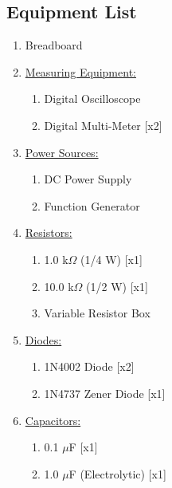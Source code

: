 \documentclass[twocolumn,english]{IEEEtran}
\begin{document}
\subsection{Equipment List}
\begin{enumerate}
  \item Breadboard
  \item \underline {Measuring Equipment:}
    \begin{enumerate}
      \item Digital Oscilloscope
      \item Digital Multi-Meter \hfill[x2]
    \end{enumerate}
  \item \underline {Power Sources:}
    \begin{enumerate}
    \item DC Power Supply
    \item Function Generator
    \end{enumerate}
  \item \underline{Resistors:}
    \begin{enumerate}
    \item 1.0 k$\Omega$ (1/4 W) \hfill[x1]
    \item 10.0 k$\Omega$ (1/2 W) \hfill[x1]
    \item Variable Resistor Box
    \end{enumerate}
  \item \underline{Diodes:}
    \begin{enumerate}
     \item 1N4002 Diode \hfill[x2]
     \item 1N4737 Zener Diode \hfill[x1]
    \end{enumerate}
  \item \underline{Capacitors:}
    \begin{enumerate}
     \item 0.1 $\mu$F \hfill[x1]
     \item 1.0 $\mu$F (Electrolytic) \hfill[x1]
    \end{enumerate}
\end{enumerate}
\end{document}
